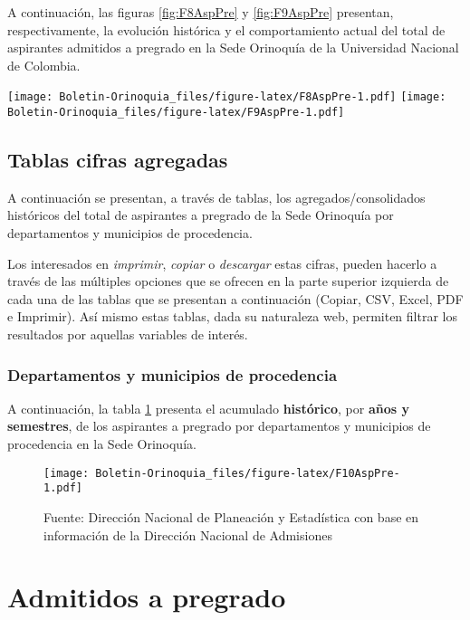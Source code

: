 \documentclass[
]{book}
\begin{document}
A continuación, las figuras \ref{fig:F8AspPre} y \ref{fig:F9AspPre} presentan, respectivamente, la evolución histórica y el comportamiento actual del total de aspirantes admitidos a pregrado en la Sede Orinoquía de la Universidad Nacional de Colombia.

\texttt{[image: Boletin-Orinoquia\_files/figure-latex/F8AspPre-1.pdf]}
\texttt{[image: Boletin-Orinoquia\_files/figure-latex/F9AspPre-1.pdf]}

\hypertarget{tablas-cifras-agregadas}{%
\subsection{Tablas cifras agregadas}\label{tablas-cifras-agregadas}}

A continuación se presentan, a través de tablas, los agregados/consolidados históricos del total de aspirantes a pregrado de la Sede Orinoquía por departamentos y municipios de procedencia.

Los interesados en \emph{imprimir}, \emph{copiar} o \emph{descargar} estas cifras, pueden hacerlo a través de las múltiples opciones que se ofrecen en la parte superior izquierda de cada una de las tablas que se presentan a continuación (Copiar, CSV, Excel, PDF e Imprimir). Así mismo estas tablas, dada su naturaleza web, permiten filtrar los resultados por aquellas variables de interés.

\hypertarget{departamentos-y-municipios-de-procedencia}{%
\subsubsection{Departamentos y municipios de procedencia}\label{departamentos-y-municipios-de-procedencia}}

A continuación, la tabla \ref{fig:F10AspPre} presenta el acumulado \textbf{histórico}, por \textbf{años y semestres}, de los aspirantes a pregrado por departamentos y municipios de procedencia en la Sede Orinoquía.

\begin{figure}
\centering
\texttt{[image: Boletin-Orinoquia\_files/figure-latex/F10AspPre-1.pdf]}
\caption{\label{fig:F10AspPre}Fuente: Dirección Nacional de Planeación y Estadística con base en información de la Dirección Nacional de Admisiones}
\end{figure}

\hypertarget{AdmPre}{%
\section{Admitidos a pregrado}\label{AdmPre}}
\end{document}
